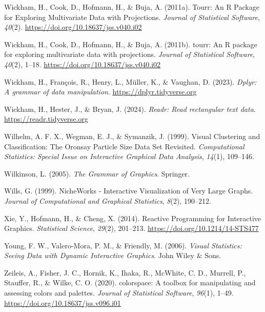 \documentclass[
  letterpaper,
]{krantz}
\newlength{\cslhangindent}
\newenvironment{CSLReferences}[2] %
 {\begin{list}{}{%
  \setlength{\itemindent}{0pt}
  \setlength{\leftmargin}{0pt}
  \setlength{\parsep}{0pt}
  \ifodd #1
   \setlength{\leftmargin}{\cslhangindent}
   \setlength{\itemindent}{-1\cslhangindent}
  \fi
  \setlength{\itemsep}{#2\baselineskip}}}
 {\end{list}}
\begin{document}
\begin{CSLReferences}{1}{0}
Wickham, H., Cook, D., Hofmann, H., \& Buja, A. (2011a). Tourr: {An} {R}
{Package} for {Exploring} {Multivariate} {Data} with {Projections}.
\emph{Journal of Statistical Software}, \emph{40}(2).
\url{https://doi.org/10.18637/jss.v040.i02}

Wickham, H., Cook, D., Hofmann, H., \& Buja, A. (2011b). {tourr}: An {R}
package for exploring multivariate data with projections. \emph{Journal
of Statistical Software}, \emph{40}(2), 1--18.
\url{https://doi.org/10.18637/jss.v040.i02}

Wickham, H., François, R., Henry, L., Müller, K., \& Vaughan, D. (2023).
\emph{Dplyr: A grammar of data manipulation}.
\url{https://dplyr.tidyverse.org}

Wickham, H., Hester, J., \& Bryan, J. (2024). \emph{Readr: Read
rectangular text data}. \url{https://readr.tidyverse.org}

Wilhelm, A. F. X., Wegman, E. J., \& Symanzik, J. (1999). Visual
{C}lustering and {C}lassification: {T}he {O}ronsay {P}article {S}ize
{D}ata {S}et {R}evisited. \emph{Computational Statistics: Special Issue
on Interactive Graphical Data Analysis}, \emph{14}(1), 109--146.

Wilkinson, L. (2005). \emph{The {G}rammar of {G}raphics}. Springer.

Wills, G. (1999). NicheWorks - {I}nteractive {V}isualization of {V}ery
{L}arge {G}raphs. \emph{Journal of Computational and Graphical
Statistics}, \emph{8}(2), 190--212.

Xie, Y., Hofmann, H., \& Cheng, X. (2014). {Reactive Programming for
Interactive Graphics}. \emph{Statistical Science}, \emph{29}(2),
201--213. \url{https://doi.org/10.1214/14-STS477}

Young, F. W., Valero-Mora, P. M., \& Friendly, M. (2006). \emph{Visual
{S}tatistics: {S}eeing {D}ata with {D}ynamic {I}nteractive {G}raphics}.
John Wiley \& Sons.

Zeileis, A., Fisher, J. C., Hornik, K., Ihaka, R., McWhite, C. D.,
Murrell, P., Stauffer, R., \& Wilke, C. O. (2020). {colorspace}: A
toolbox for manipulating and assessing colors and palettes.
\emph{Journal of Statistical Software}, \emph{96}(1), 1--49.
\url{https://doi.org/10.18637/jss.v096.i01}


\end{CSLReferences}
\end{document}
